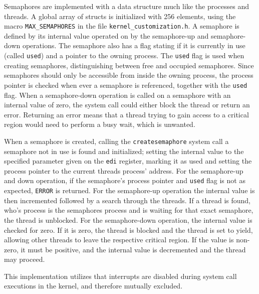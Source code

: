 Semaphores are implemented with a data structure much like the processes and threads. A global array of structs is initialized with 256 elements, using the macro \texttt{MAX\_SEMAPHORES} in the file \texttt{kernel\_customization.h}. A semaphore is defined by its internal value operated on by the semaphore-up and semaphore-down operations. The semaphore also has a flag stating if it is currently in use (called \texttt{used}) and a pointer to the owning process. The \texttt{used} flag is used when creating semaphores, distinguishing between free and occupied semaphores. Since semaphores should only be accessible from inside the owning process, the process pointer is checked when ever a semaphore is referenced, together with the \texttt{used} flag. When a semaphore-down operation is called on a semaphore with an internal value of zero, the system call could either block the thread or return an error. Returning an error means that a thread trying to gain access to a critical region would need to perform a busy wait, which is unwanted. 

When a semaphore is created, calling the \texttt{createsemaphore} system call a semaphore not in use is found and initialized; setting the internal value to the specified parameter given on the \texttt{edi} register, marking it as used and setting the process pointer to the current threads process' address. For the semaphore-up and down operation, if the semaphore's process pointer and \texttt{used} flag is not as expected, \texttt{ERROR} is returned. For the semaphore-up operation the internal value is then incremented followed by a search through the threads. If a thread is found, who's process is the semaphores process and is waiting for that exact semaphore, the thread is unblocked. For the semaphore-down operation, the internal value is checked for zero. If it is zero, the thread is blocked and the thread is set to yield, allowing other threads to leave the respective critical region. If the value is non-zero, it must be positive, and the internal value is decremented and the thread may proceed.

This implementation utilizes that interrupts are disabled during system call executions in the kernel, and therefore mutually excluded. 